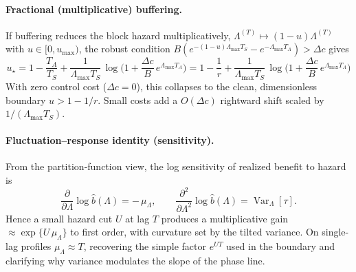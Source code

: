 \documentclass[11pt]{article}
\theoremstyle{upright}
\newcommand{\horizon}{\Lambda}
\newcommand{\Lmax}{\horizon^{(T)}_{\max}}
\newcommand{\hazT}[1]{\Lambda^{(#1)}}          %
\renewcommand{\Lmax}{\Lambda_{\max}}
\begin{document}
\paragraph{Fractional (multiplicative) buffering.}
If buffering reduces the block hazard multiplicatively, $\hazT{T}\mapsto(1-u)\hazT{T}$ with $u\in[0,u_{\max})$, the robust condition $B(e^{-(1-u)\Lmax T_S}-e^{-\Lmax T_A})>\Delta c$ gives
\begin{equation}
\label{eq:robust-u}
\boxed{
u_\star = 1-\frac{T_A}{T_S} + \frac{1}{\Lmax T_S}\,\log\!\Big(1+\frac{\Delta c}{B}\,e^{\Lmax T_A}\Big)
= 1-\frac{1}{r} + \frac{1}{\Lmax T_S}\,\log\!\Big(1+\frac{\Delta c}{B}\,e^{\Lmax T_A}\Big)
}
\end{equation}
With zero control cost ($\Delta c=0$), this collapses to the clean, dimensionless boundary $u>1-1/r$. Small costs add a $O(\Delta c)$ rightward shift scaled by $1/(\Lmax T_S)$.

\paragraph{Fluctuation–response identity (sensitivity).}
From the partition-function view, the log sensitivity of realized benefit to hazard is
\[
\frac{\partial}{\partial \Lambda}\log \widehat b(\Lambda) = -\,\mu_\Lambda, \qquad
\frac{\partial^2}{\partial \Lambda^2}\log \widehat b(\Lambda)= \operatorname{Var}_\Lambda[\tau].
\]
Hence a small hazard cut $U$ at lag $T$ produces a multiplicative gain $\approx \exp\{U\,\mu_\Lambda\}$ to first order,
with curvature set by the tilted variance. On single-lag profiles $\mu_\Lambda\!\approx\!T$, recovering the simple factor
$e^{U T}$ used in the boundary and clarifying why variance modulates the slope of the phase line.
\end{document}
